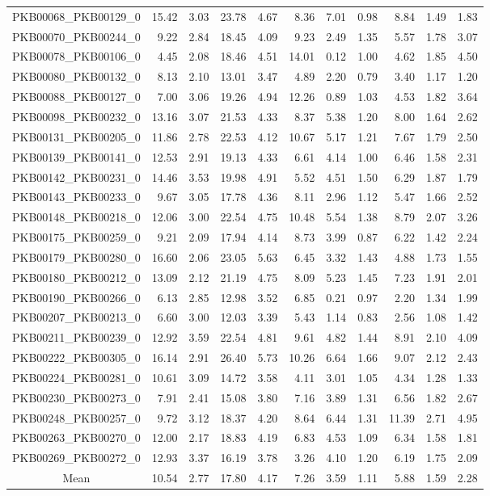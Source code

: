 {\begin{longtable}{@{}cr@{\hspace{1em}}r@{\hspace{1em}}r@{\hspace{1em}}r@{\hspace{1em}}r@{\hspace{2em}}r@{\hspace{1em}}r@{\hspace{1em}}r@{\hspace{1em}}r@{\hspace{1em}}r@{}}
PKB00068\_PKB00129\_0&15.42&3.03&23.78&4.67&8.36&7.01&0.98&8.84&1.49&1.83\\
PKB00070\_PKB00244\_0&9.22&2.84&18.45&4.09&9.23&2.49&1.35&5.57&1.78&3.07\\
PKB00078\_PKB00106\_0&4.45&2.08&18.46&4.51&14.01&0.12&1.00&4.62&1.85&4.50\\
PKB00080\_PKB00132\_0&8.13&2.10&13.01&3.47&4.89&2.20&0.79&3.40&1.17&1.20\\
PKB00088\_PKB00127\_0&7.00&3.06&19.26&4.94&12.26&0.89&1.03&4.53&1.82&3.64\\
PKB00098\_PKB00232\_0&13.16&3.07&21.53&4.33&8.37&5.38&1.20&8.00&1.64&2.62\\
PKB00131\_PKB00205\_0&11.86&2.78&22.53&4.12&10.67&5.17&1.21&7.67&1.79&2.50\\
PKB00139\_PKB00141\_0&12.53&2.91&19.13&4.33&6.61&4.14&1.00&6.46&1.58&2.31\\
PKB00142\_PKB00231\_0&14.46&3.53&19.98&4.91&5.52&4.51&1.50&6.29&1.87&1.79\\
PKB00143\_PKB00233\_0&9.67&3.05&17.78&4.36&8.11&2.96&1.12&5.47&1.66&2.52\\
PKB00148\_PKB00218\_0&12.06&3.00&22.54&4.75&10.48&5.54&1.38&8.79&2.07&3.26\\
PKB00175\_PKB00259\_0&9.21&2.09&17.94&4.14&8.73&3.99&0.87&6.22&1.42&2.24\\
PKB00179\_PKB00280\_0&16.60&2.06&23.05&5.63&6.45&3.32&1.43&4.88&1.73&1.55\\
PKB00180\_PKB00212\_0&13.09&2.12&21.19&4.75&8.09&5.23&1.45&7.23&1.91&2.01\\
PKB00190\_PKB00266\_0&6.13&2.85&12.98&3.52&6.85&0.21&0.97&2.20&1.34&1.99\\
PKB00207\_PKB00213\_0&6.60&3.00&12.03&3.39&5.43&1.14&0.83&2.56&1.08&1.42\\
PKB00211\_PKB00239\_0&12.92&3.59&22.54&4.81&9.61&4.82&1.44&8.91&2.10&4.09\\
PKB00222\_PKB00305\_0&16.14&2.91&26.40&5.73&10.26&6.64&1.66&9.07&2.12&2.43\\
PKB00224\_PKB00281\_0&10.61&3.09&14.72&3.58&4.11&3.01&1.05&4.34&1.28&1.33\\
PKB00230\_PKB00273\_0&7.91&2.41&15.08&3.80&7.16&3.89&1.31&6.56&1.82&2.67\\
PKB00248\_PKB00257\_0&9.72&3.12&18.37&4.20&8.64&6.44&1.31&11.39&2.71&4.95\\
PKB00263\_PKB00270\_0&12.00&2.17&18.83&4.19&6.83&4.53&1.09&6.34&1.58&1.81\\
PKB00269\_PKB00272\_0&12.93&3.37&16.19&3.78&3.26&4.10&1.20&6.19&1.75&2.09\\
\midrule
Mean&10.54&2.77&17.80&4.17&7.26&3.59&1.11&5.88&1.59&2.28\\
\bottomrule
\end{longtable}}

